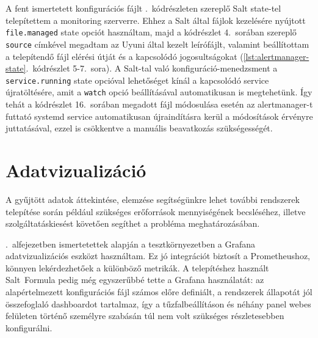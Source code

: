 \begin{figure}[htb]
	
\end{figure}

A fent ismertetett konfigurációs fájlt .~kódrészleten szereplő Salt state-tel telepítettem a monitoring szerverre. Ehhez a Salt által fájlok kezelésére nyújtott \texttt{file.managed} state opciót használtam, majd a kódrészlet 4.~sorában szereplő \texttt{source} címkével megadtam az Uyuni által kezelt leírófájlt, valamint beállítottam a telepítendő fájl elérési útját és a kapcsolódó jogosultságokat (\ref{lst:alertmanager-state}.~kódrészlet 5-7.~sora). 
A Salt-tal való konfiguráció-menedzsment a \texttt{service.running} state opcióval lehetőséget kínál a kapcsolódó service újratöltésére, amit a \texttt{watch} opció beállításával automatikusan is megtehetünk. Így tehát a kódrészlet 16.~sorában megadott fájl módosulása esetén az alertmanager-t futtató systemd service automatikusan újraindításra kerül a módosítások érvényre juttatásával, ezzel is csökkentve a manuális beavatkozás szükségességét.

\begin{figure}[ht]
	
\end{figure}


\section{Adatvizualizáció}
A gyűjtött adatok áttekintése, elemzése segítségünkre lehet további rendszerek telepítése során például szükséges erőforrások mennyiségének becsléséhez, illetve szolgáltatáskiesést követően segíthet a probléma meghatározásában.

.~alfejezetben ismertetettek alapján a tesztkörnyezetben a Grafana adatvizualizációs eszközt használtam. Ez jó integrációt biztosít a Prometheushoz, könnyen lekérdezhetőek a különböző metrikák. A telepítéshez használt Salt~Formula pedig még egyszerűbbé tette a Grafana használatát: az alapértelmezett konfigurációs fájl számos előre definiált, a rendszerek állapotát jól összefoglaló dashboardot tartalmaz, így a tűzfalbeállításon és néhány panel webes felületen történő személyre szabásán túl nem volt szükséges részletesebben konfigurálni.

